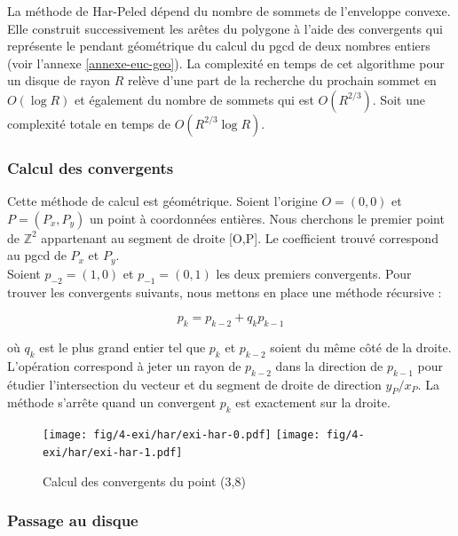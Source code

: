 La méthode de Har-Peled dépend du nombre de sommets de l'enveloppe convexe. Elle construit successivement les arêtes du polygone à l'aide des convergents qui représente le pendant géométrique du calcul du pgcd de deux nombres entiers (voir l'annexe \ref{annexe-euc-geo}). La complexité en temps de cet algorithme pour un disque de rayon $R$ relève d'une part de la recherche du prochain sommet en $O(\log R)$ et également du nombre de sommets qui est $O(R^{2/3})$. Soit une complexité totale en temps de $O( R^{2/3} \log R)$.

\subsubsection{Calcul des convergents}

Cette méthode de calcul est géométrique. Soient l’origine $O=(0,0)$ et $P = (P_x, P_y)$ un point à coordonnées entières. Nous cherchons le premier point de $\mathbb{Z}^{2}$ appartenant au segment de droite [O,P]. Le coefficient trouvé correspond au pgcd de $P_x$ et $P_y$.\\

Soient $p_{-2} = (1,0)$ et $p_{-1} = (0,1)$ les deux premiers convergents. Pour trouver les convergents suivants, nous mettons en place une méthode récursive :

$$p_{k} = p_{k-2} + q_k p_{k-1}$$

où $q_k$ est le plus grand entier tel que $p_{k}$ et $p_{k-2}$ soient du même côté de la droite.\\

L'opération correspond à jeter un rayon de $p_{k-2}$ dans la direction de $p_{k-1}$ pour étudier l’intersection du vecteur et du segment de droite de direction $y_P / x_P$. La méthode s’arrête quand un convergent $p_{k}$ est exactement sur la droite.\\

\begin{figure}[H]
  \centering
  \texttt{[image: fig/4-exi/har/exi-har-0.pdf]}
  \texttt{[image: fig/4-exi/har/exi-har-1.pdf]}
  \caption{Calcul des convergents du point (3,8)}
\end{figure}


\subsubsection{Passage au disque}


